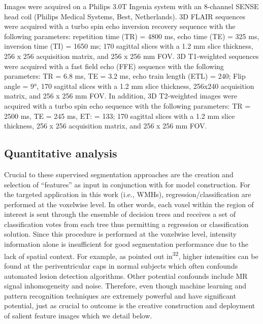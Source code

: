 \documentclass[11pt,]{article}
\begin{document}
Images were acquired on a Philips 3.0T Ingenia system with an 8-channel
SENSE head coil (Philips Medical Systems, Best, Netherlands). 3D FLAIR
sequences were acquired with a turbo spin echo inversion recovery
sequence with the following parameters: repetition time (TR) = 4800 ms,
echo time (TE) = 325 ms, inversion time (TI) = 1650 ms; 170 sagittal
slices with a 1.2 mm slice thickness, 256 x 256 acquisition matrix, and
256 x 256 mm FOV. 3D T1-weighted sequences were acquired with a fast
field echo (FFE) sequence with the following parameters: TR = 6.8 ms, TE
= 3.2 ms, echo train length (ETL) = 240; Flip angle = 9°, 170 sagittal
slices with a 1.2 mm slice thickness, 256x240 acquisition matrix, and
256 x 256 mm FOV. In addition, 3D T2-weighted images were acquired with
a turbo spin echo sequence with the following parameters: TR = 2500 ms,
TE = 245 ms, ET: = 133; 170 sagittal slices with a 1.2 mm slice
thickness, 256 x 256 acquisition matrix, and 256 x 256 mm FOV.

\subsection{Quantitative analysis}\label{quantitative-analysis}

Crucial to these supervised segmentation approaches are the creation and
selection of ``features'' as input in conjunction with
 for model
construction. For the targeted application in this work (i.e., WMHs),
regression/classification are performed at the voxelwise level. In other
words, each voxel within the region of interest is sent through the
ensemble of decision trees and receives a set of classification votes
from each tree thus permitting a regression or classification solution.
Since this procedure is performed at the voxelwise level, intensity
information alone is insufficient for good segmentation performance due
to the lack of spatial context. For example, as pointed out
in\textsuperscript{32}, higher intensities can be found at the
periventricular caps in normal subjects which often confounds automated
lesion detection algorithms. Other potential confounds include MR signal
inhomogeneity and noise. Therefore, even though machine learning and
pattern recognition techniques are extremely powerful and have
significant potential, just as crucial to outcome is the creative
construction and deployment of salient feature images which we detail
below.
\end{document}
